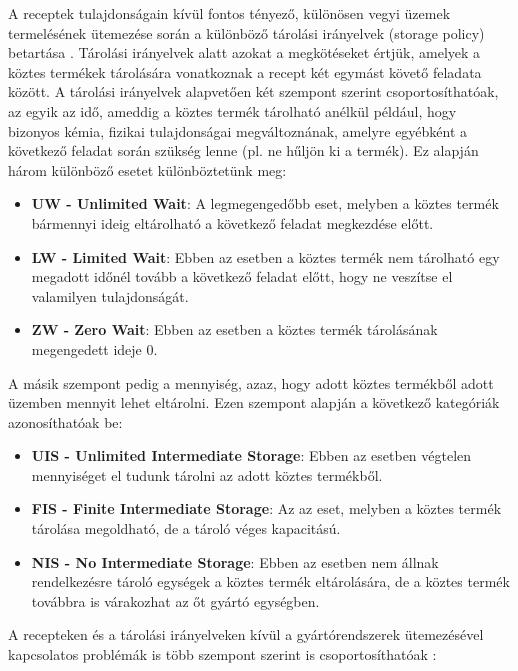 A receptek tulajdonságain kívül fontos tényező, különösen vegyi üzemek termelésének ütemezése során a különböző tárolási irányelvek (storage policy) betartása \cite{phd_Hegyhati}.
Tárolási irányelvek alatt azokat a megkötéseket értjük, amelyek a köztes termékek tárolására vonatkoznak a recept két egymást követő feladata között.
A tárolási irányelvek alapvetően két szempont szerint csoportosíthatóak, az egyik az idő, ameddig a köztes termék tárolható anélkül például, hogy bizonyos kémia, fizikai tulajdonságai megváltoznának, amelyre egyébként a következő feladat során szükség lenne (pl. ne hűljön ki a termék).
Ez alapján három különböző esetet különböztetünk meg:
\begin{itemize}
\item[]\textbf{UW - Unlimited Wait}: A legmegengedőbb eset, melyben a köztes termék bármennyi ideig eltárolható a következő feladat megkezdése előtt.
\item[]\textbf{LW - Limited Wait}: Ebben az esetben a köztes termék nem tárolható egy megadott időnél tovább a következő feladat előtt, hogy ne veszítse el valamilyen tulajdonságát.
\item[]\textbf{ZW - Zero Wait}: Ebben az esetben a köztes termék tárolásának megengedett ideje 0.
\end{itemize}
A másik szempont pedig a mennyiség, azaz, hogy adott köztes termékből adott üzemben mennyit lehet eltárolni.
Ezen szempont alapján a következő kategóriák azonosíthatóak be:
\begin{itemize}
\item[]\textbf{UIS - Unlimited Intermediate Storage}: Ebben az esetben végtelen mennyiséget el tudunk tárolni az adott köztes termékből.
\item[]\textbf{FIS - Finite Intermediate Storage}: Az az eset, melyben a köztes termék tárolása megoldható, de a tároló véges kapacitású.
\item[]\textbf{NIS - No Intermediate Storage}: Ebben az esetben nem állnak rendelkezésre tároló egységek a köztes termék eltárolására, de a köztes termék továbbra is várakozhat az őt gyártó egységben.
\end{itemize}
A recepteken és a tárolási irányelveken kívül a gyártórendszerek ütemezésével kapcsolatos problémák is több szempont szerint is csoportosíthatóak \cite{phd_Hegyhati}:
